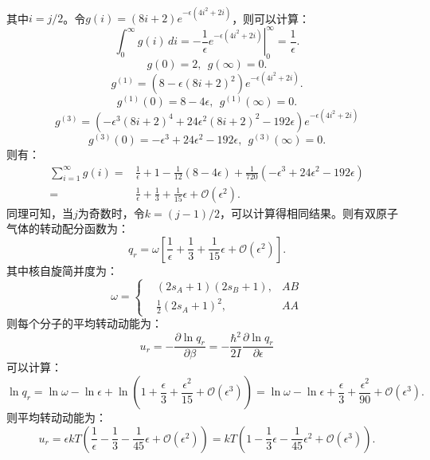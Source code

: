 \documentclass[reqno,a4paper,12pt]{amsart}
\begin{document}
\begin{tcolorbox}[breakable, colback = black!5!white, colframe = black]
\begin{align*}
\end{align*}
其中$i=j/2$。令$g(i) = (8i+2) e^{-\epsilon (4i^2+2i)}$，则可以计算：
\[
	\int_0^{\infty} g(i)\,di = \left. -\frac{1}{\epsilon}e^{-\epsilon(4i^2+2i)} \right\vert_0^\infty = \frac{1}{\epsilon}.
\]
\[
	g(0) = 2, ~~ g(\infty) = 0.
\]
\[
	g^{(1)} = (8-\epsilon(8i+2)^2) e^{-\epsilon(4i^2+2i)}.
\]
\[
	g^{(1)}(0) = 8-4\epsilon, ~~ g^{(1)}(\infty) = 0.
\]
\[
	g^{(3)} = \left( -\epsilon^3(8i+2)^4 + 24\epsilon^2(8i+2)^2 - 192 \epsilon \right) e^{-\epsilon(4i^2+2i)}
\]
\[
	g^{(3)}(0) = -\epsilon^3 + 24\epsilon^2 - 192\epsilon, ~~ g^{(3)}(\infty) = 0.
\]
则有：
\begin{align*}
	\sum_{i=1}^{\infty}g(i) =& \frac{1}{\epsilon} + 1 - \frac{1}{12}(8-4\epsilon) + \frac{1}{720}(-\epsilon^3 + 24\epsilon^2 - 192\epsilon) \\
	=& \frac{1}{\epsilon} + \frac{1}{3} + \frac{1}{15}\epsilon + \mathcal{O}(\epsilon^2).
\end{align*}
同理可知，当$j$为奇数时，令$k=(j-1)/2$，可以计算得相同结果。则有双原子气体的转动配分函数为：
\[
	q_r = \omega \left[ \frac{1}{\epsilon} + \frac{1}{3} + \frac{1}{15}\epsilon + \mathcal{O}(\epsilon^2) \right].
\]
其中核自旋简并度为：
\[
	\omega = \left\{
	\begin{aligned}
		&(2s_A+1)(2s_B+1), & AB \\
		&\frac{1}{2}(2s_A+1)^2, & AA
	\end{aligned}\right.
\]
则每个分子的平均转动动能为：
\[
	u_r = -\frac{\partial\ln q_r}{\partial\beta} = -\frac{\hbar^2}{2I}\frac{\partial \ln q_r}{\partial \epsilon} 
\]
可以计算：
\[
	\ln q_r = \ln \omega - \ln \epsilon + \ln\left( 1+\frac{\epsilon}{3} + \frac{\epsilon^2}{15} + \mathcal{O}(\epsilon^3) \right) = \ln \omega - \ln \epsilon + \frac{\epsilon}{3} + \frac{\epsilon^2}{90} + \mathcal{O}(\epsilon^3).
\]
则平均转动动能为：
\[
	u_r = \epsilon kT\left( \frac{1}{\epsilon} - \frac{1}{3} - \frac{1}{45}\epsilon + \mathcal{O}(\epsilon^2) \right) = kT\left( 1 - \frac{1}{3}\epsilon - \frac{1}{45}\epsilon^2 + \mathcal{O}(\epsilon^3) \right).
\]
\end{tcolorbox}
\end{document}
